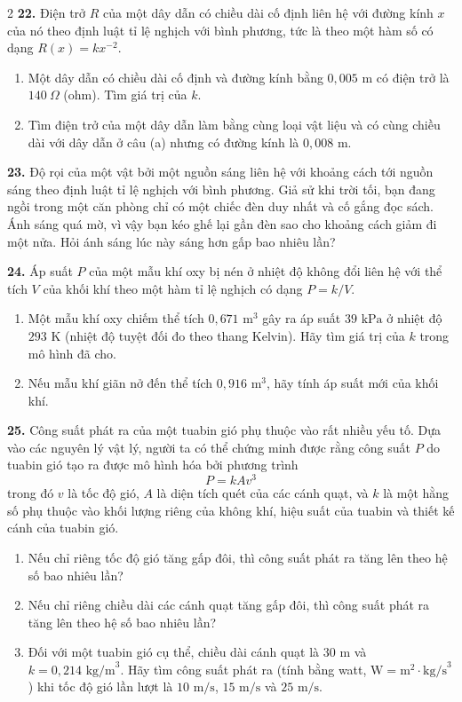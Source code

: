 \begin{multicols}{2}
\noindent\textbf{22.} Điện trở $R$ của một dây dẫn có chiều dài cố định liên hệ với đường kính $x$ của nó theo định luật tỉ lệ nghịch với bình phương, tức là theo một hàm số có dạng $R(x) = kx^{-2}$.
\begin{enumerate}[label=(\alph*), leftmargin=*, itemsep=1pt]
    \item Một dây dẫn có chiều dài cố định và đường kính bằng $0{,}005\text{ m}$ có điện trở là $140\ \Omega$ (ohm). Tìm giá trị của $k$.
    \item Tìm điện trở của một dây dẫn làm bằng cùng loại vật liệu và có cùng chiều dài với dây dẫn ở câu (a) nhưng có đường kính là $0{,}008\text{ m}$.
\end{enumerate}

\noindent\textbf{23.} Độ rọi của một vật bởi một nguồn sáng liên hệ với khoảng cách tới nguồn sáng theo định luật tỉ lệ nghịch với bình phương. Giả sử khi trời tối, bạn đang ngồi trong một căn phòng chỉ có một chiếc đèn duy nhất và cố gắng đọc sách. Ánh sáng quá mờ, vì vậy bạn kéo ghế lại gần đèn sao cho khoảng cách giảm đi một nửa. Hỏi ánh sáng lúc này sáng hơn gấp bao nhiêu lần?

\noindent\textbf{24.} Áp suất $P$ của một mẫu khí oxy bị nén ở nhiệt độ không đổi liên hệ với thể tích $V$ của khối khí theo một hàm tỉ lệ nghịch có dạng $P = k/V$.
\begin{enumerate}[label=(\alph*), leftmargin=*, itemsep=1pt]
    \item Một mẫu khí oxy chiếm thể tích $0{,}671\text{ m}^3$ gây ra áp suất $39\text{ kPa}$ ở nhiệt độ $293\text{ K}$ (nhiệt độ tuyệt đối đo theo thang Kelvin). Hãy tìm giá trị của $k$ trong mô hình đã cho.
    \item Nếu mẫu khí giãn nở đến thể tích $0{,}916\text{ m}^3$, hãy tính áp suất mới của khối khí.
\end{enumerate}

\noindent\textbf{25.} Công suất phát ra của một tuabin gió phụ thuộc vào rất nhiều yếu tố. Dựa vào các nguyên lý vật lý, người ta có thể chứng minh được rằng công suất $P$ do tuabin gió tạo ra được mô hình hóa bởi phương trình
\[ P = kAv^3 \]
trong đó $v$ là tốc độ gió, $A$ là diện tích quét của các cánh quạt, và $k$ là một hằng số phụ thuộc vào khối lượng riêng của không khí, hiệu suất của tuabin và thiết kế cánh của tuabin gió.
\begin{enumerate}[label=(\alph*), leftmargin=*, itemsep=1pt]
    \item Nếu chỉ riêng tốc độ gió tăng gấp đôi, thì công suất phát ra tăng lên theo hệ số bao nhiêu lần?
    \item Nếu chỉ riêng chiều dài các cánh quạt tăng gấp đôi, thì công suất phát ra tăng lên theo hệ số bao nhiêu lần?
    \item Đối với một tuabin gió cụ thể, chiều dài cánh quạt là $30\text{ m}$ và $k = 0{,}214\text{ kg/m}^3$. Hãy tìm công suất phát ra (tính bằng watt, $\text{W} = \text{m}^2 \cdot \text{kg/s}^3$) khi tốc độ gió lần lượt là $10\text{ m/s}$, $15\text{ m/s}$ và $25\text{ m/s}$.
\end{enumerate}


\end{multicols}
